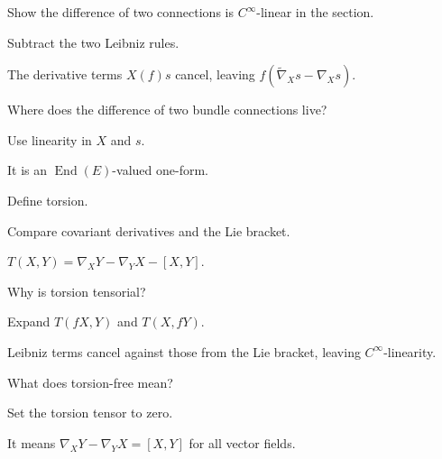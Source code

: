 \begin{exercise}\label{exr:vii21-14}
Show the difference of two connections is \(C^\infty\)-linear in the section.
\end{exercise}
\begin{hint}
Subtract the two Leibniz rules.
\end{hint}
\begin{solution}
The derivative terms \(X(f)s\) cancel, leaving \(f(\widetilde\nabla_Xs-\nabla_Xs)\).
\end{solution}

\begin{exercise}\label{exr:vii21-15}
Where does the difference of two bundle connections live?
\end{exercise}
\begin{hint}
Use linearity in \(X\) and \(s\).
\end{hint}
\begin{solution}
It is an \(\operatorname{End}(E)\)-valued one-form.
\end{solution}

\begin{exercise}\label{exr:vii21-16}
Define torsion.
\end{exercise}
\begin{hint}
Compare covariant derivatives and the Lie bracket.
\end{hint}
\begin{solution}
\(T(X,Y)=\nabla_XY-\nabla_YX-[X,Y]\).
\end{solution}

\begin{exercise}\label{exr:vii21-17}
Why is torsion tensorial?
\end{exercise}
\begin{hint}
Expand \(T(fX,Y)\) and \(T(X,fY)\).
\end{hint}
\begin{solution}
Leibniz terms cancel against those from the Lie bracket, leaving \(C^\infty\)-linearity.
\end{solution}

\begin{exercise}\label{exr:vii21-18}
What does torsion-free mean?
\end{exercise}
\begin{hint}
Set the torsion tensor to zero.
\end{hint}
\begin{solution}
It means \(\nabla_XY-\nabla_YX=[X,Y]\) for all vector fields.
\end{solution}

